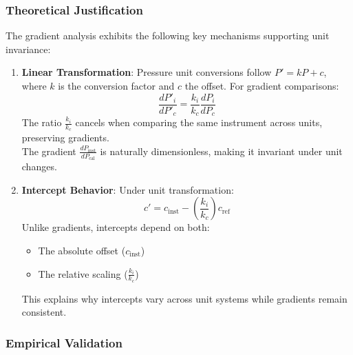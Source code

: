 \documentclass{article}
\begin{document}
\subsubsection{Theoretical Justification}
The gradient analysis exhibits the following key mechanisms supporting unit invariance:\\
\begin{enumerate}
	\item \textbf{Linear Transformation}: 
	Pressure unit conversions follow $P' = kP + c$, where $k$ is the conversion factor and $c$ the offset. For gradient comparisons:
	\begin{equation}
		\frac{dP'_i}{dP'_c} = \frac{k_i}{k_c} \frac{dP_i}{dP_c}
	\end{equation}
	The ratio $\frac{k_i}{k_c}$ cancels when comparing the same instrument across units, preserving gradients.\\
	The gradient $\frac{d P_{\text{inst}}}{d P_{\text{cal}}}$ is naturally dimensionless, making it invariant under unit changes.
	\item \textbf{Intercept Behavior}: 
	Under unit transformation:
	\begin{equation}
		c' = c_{\text{inst}} - \left(\frac{k_i}{k_c}\right)c_{\text{ref}}
	\end{equation}
	Unlike gradients, intercepts depend on both:
	\begin{itemize}
		\item The absolute offset ($c_{\text{inst}}$)
		\item The relative scaling ($\frac{k_i}{k_c}$)
	\end{itemize}
	This explains why intercepts vary across unit systems while gradients remain consistent.
\end{enumerate}\vspace{-1em}
\subsubsection{Empirical Validation}\label{empirical-validation}
\end{document}
